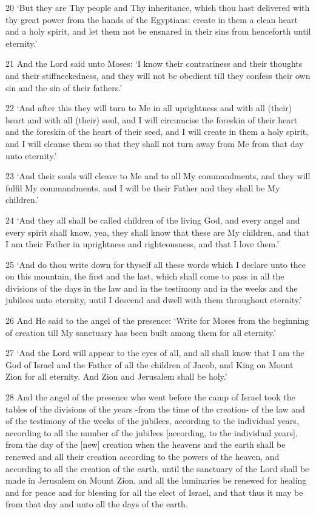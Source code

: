 \par 20 ‘But they are Thy people and Thy inheritance, which thou hast delivered with thy great power from the hands of the Egyptians: create in them a clean heart and a holy spirit, and let them not be ensnared in their sins from henceforth until eternity.’
\par 21 And the Lord said unto Moses: ‘I know their contrariness and their thoughts and their stiffneckedness, and they will not be obedient till they confess their own sin and the sin of their fathers.’
\par 22 ‘And after this they will turn to Me in all uprightness and with all (their) heart and with all (their) soul, and I will circumcise the foreskin of their heart and the foreskin of the heart of their seed, and I will create in them a holy spirit, and I will cleanse them so that they shall not turn away from Me from that day unto eternity.’
\par 23 ‘And their souls will cleave to Me and to all My commandments, and they will fulfil My commandments, and I will be their Father and they shall be My children.’
\par 24 ‘And they all shall be called children of the living God, and every angel and every spirit shall know, yea, they shall know that these are My children, and that I am their Father in uprightness and righteousness, and that I love them.’
\par 25 ‘And do thou write down for thyself all these words which I declare unto thee on this mountain, the first and the last, which shall come to pass in all the divisions of the days in the law and in the testimony and in the weeks and the jubilees unto eternity, until I descend and dwell with them throughout eternity.’
\par 26 And He said to the angel of the presence: ‘Write for Moses from the beginning of creation till My sanctuary has been built among them for all eternity.’
\par 27 ‘And the Lord will appear to the eyes of all, and all shall know that I am the God of Israel and the Father of all the children of Jacob, and King on Mount Zion for all eternity. And Zion and Jerusalem shall be holy.’
\par 28 And the angel of the presence who went before the camp of Israel took the tables of the divisions of the years -from the time of the creation- of the law and of the testimony of the weeks of the jubilees, according to the individual years, according to all the number of the jubilees [according, to the individual years], from the day of the [new] creation when the heavens and the earth shall be renewed and all their creation according to the powers of the heaven, and according to all the creation of the earth, until the sanctuary of the Lord shall be made in Jerusalem on Mount Zion, and all the luminaries be renewed for healing and for peace and for blessing for all the elect of Israel, and that thus it may be from that day and unto all the days of the earth.

